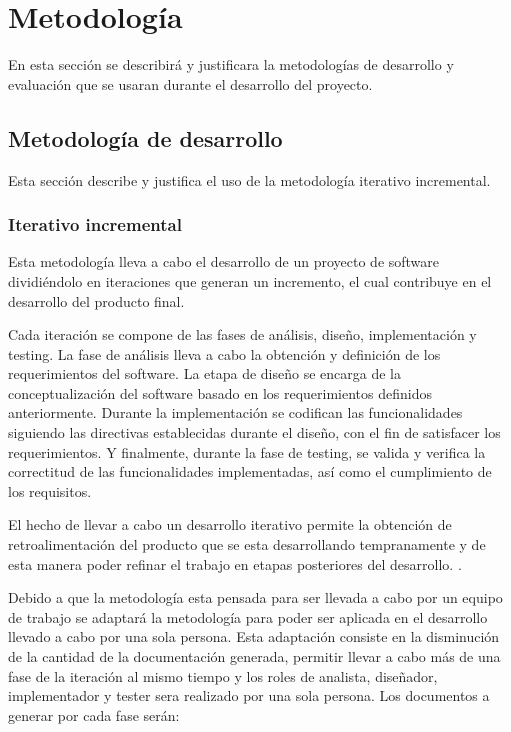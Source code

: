 \documentclass[11pt,letterpaper]{article}
\begin{document}
\section{Metodología}

En esta sección se describirá y justificara la metodologías de desarrollo y evaluación que se usaran durante el desarrollo del proyecto.
\subsection{Metodología de desarrollo}


Esta sección describe y justifica el uso de la metodología iterativo incremental.
\subsubsection{Iterativo incremental}

Esta metodología lleva a cabo el desarrollo de un proyecto de software dividiéndolo en iteraciones que generan un incremento, el cual contribuye en el desarrollo del producto final. 

Cada iteración se compone de las fases de análisis, diseño, implementación y testing. La fase de análisis lleva a cabo la obtención y definición de los requerimientos del software. La etapa de diseño se encarga de la conceptualización del software basado en los requerimientos definidos anteriormente. Durante la implementación se codifican las funcionalidades siguiendo las directivas establecidas durante el diseño, con el fin de satisfacer los requerimientos. Y finalmente, durante la fase de testing, se valida y verifica la correctitud de las funcionalidades implementadas, así como el cumplimiento de los requisitos. 

El hecho de llevar a cabo un desarrollo iterativo permite la obtención de retroalimentación del producto que se esta desarrollando tempranamente y de esta manera poder refinar el trabajo en etapas posteriores del desarrollo. \cite{Victor2003, Mitchell2009, Martin1999,Alshamrani2015}.

Debido a que la metodología esta pensada para ser llevada a cabo por un equipo de trabajo se adaptará la metodología para poder ser aplicada en el desarrollo llevado a cabo por una sola persona. Esta adaptación consiste en la disminución de la cantidad de la documentación generada, permitir llevar a cabo más de una fase de la iteración al mismo tiempo y los roles de analista, diseñador, implementador y tester sera realizado por una sola persona. Los documentos a generar por cada fase serán:
\end{document}
